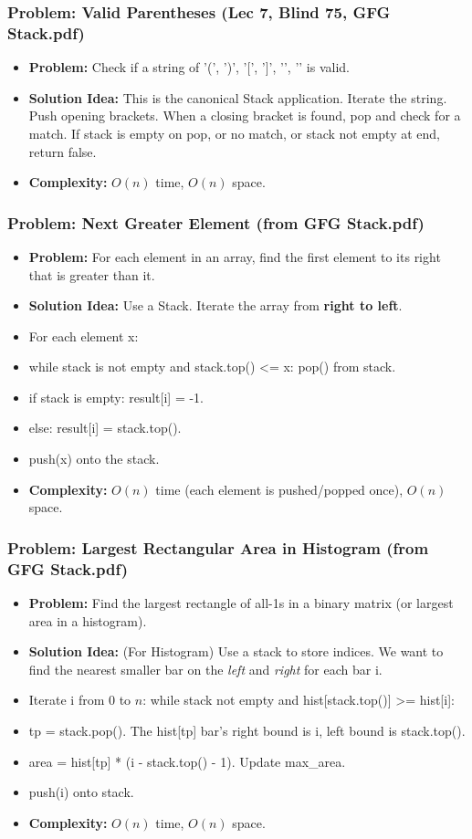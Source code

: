 \subsubsection{Problem: Valid Parentheses (Lec 7, Blind 75, GFG Stack.pdf)}
\begin{itemize}
\item \textbf{Problem:} Check if a string of '(', ')', '[', ']', '{', '}' is valid.
\item \textbf{Solution Idea:} This is the canonical Stack application. Iterate the string. Push opening brackets. When a closing bracket is found, pop and check for a match. If stack is empty on pop, or no match, or stack not empty at end, return false.
\item \textbf{Complexity:} $O(n)$ time, $O(n)$ space.
\end{itemize}

\subsubsection{Problem: Next Greater Element (from GFG Stack.pdf)}
\begin{itemize}
\item \textbf{Problem:} For each element in an array, find the first element to its right that is greater than it.
\item \textbf{Solution Idea:} Use a Stack. Iterate the array from \textbf{right to left}.
\item For each element x:
\item while stack is not empty and stack.top() <= x: pop() from stack.
\item if stack is empty: result[i] = -1.
\item else: result[i] = stack.top().
\item push(x) onto the stack.
\item \textbf{Complexity:} $O(n)$ time (each element is pushed/popped once), $O(n)$ space.
\end{itemize}

\subsubsection{Problem: Largest Rectangular Area in Histogram (from GFG Stack.pdf)}
\begin{itemize}
\item \textbf{Problem:} Find the largest rectangle of all-1s in a binary matrix (or largest area in a histogram).
\item \textbf{Solution Idea:} (For Histogram) Use a stack to store indices. We want to find the nearest smaller bar on the \textit{left} and \textit{right} for each bar i.
\item Iterate i from 0 to $n$: while stack not empty and hist[stack.top()] >= hist[i]:
\item tp = stack.pop(). The hist[tp] bar's right bound is i, left bound is stack.top().
\item area = hist[tp] * (i - stack.top() - 1). Update max\_area.
\item push(i) onto stack.
\item \textbf{Complexity:} $O(n)$ time, $O(n)$ space.
\end{itemize}

